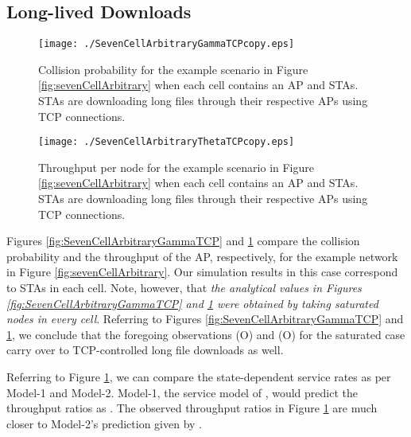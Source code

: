 \documentclass[10pt,a4paper,journal]{IEEEtran}
\theoremstyle{definition}
\theoremstyle{remark}
\theoremstyle{plain}
\begin{document}
\subsection{Long-lived Downloads}
\label{subsec:results-TCP-long}


\begin{figure}[tb]
\centering
\begin{minipage}{8.25cm}
\begin{center}
\texttt{[image: ./SevenCellArbitraryGammaTCPcopy.eps]}
\caption{Collision probability  for the example
  scenario in Figure \ref{fig:sevenCellArbitrary} when each cell
  contains an AP and  STAs.  STAs are downloading long files
  through their respective APs using TCP
  connections.\label{fig:SevenCellArbitraryGammaTCP}}
  \vspace{2mm}
\end{center}
\end{minipage}
\hfill
\begin{minipage}{8.25cm}
\begin{center}
\texttt{[image: ./SevenCellArbitraryThetaTCPcopy.eps]}
\caption{Throughput per node  for the example
  scenario in Figure \ref{fig:sevenCellArbitrary} when each cell
  contains an AP and  STAs.  STAs are downloading long files
  through their respective APs using TCP
  connections.\label{fig:SevenCellArbitraryThetaTCP}}
\end{center}
\end{minipage}
\end{figure}



Figures \ref{fig:SevenCellArbitraryGammaTCP} and \ref{fig:SevenCellArbitraryThetaTCP} compare the collision probability  and the throughput of the AP, respectively, for the example network in Figure \ref{fig:sevenCellArbitrary}. Our simulation results in this case correspond to  STAs in each cell. Note, however, that \textit{the analytical values in Figures \ref{fig:SevenCellArbitraryGammaTCP} and \ref{fig:SevenCellArbitraryThetaTCP} were obtained by taking  saturated nodes in every cell}. Referring to Figures \ref{fig:SevenCellArbitraryGammaTCP} and \ref{fig:SevenCellArbitraryThetaTCP}, we conclude that the foregoing observations (O) and (O) for the saturated case carry over to TCP-controlled long file downloads as well. 

Referring to Figure \ref{fig:SevenCellArbitraryThetaTCP}, we can compare the state-dependent service rates as per Model-1 and Model-2. Model-1, the service model of \cite{wanet.bonald08multicellprocsharing}, would predict the throughput ratios as . The observed throughput ratios in Figure \ref{fig:SevenCellArbitraryThetaTCP} are much closer to Model-2's prediction given by .
\end{document}
